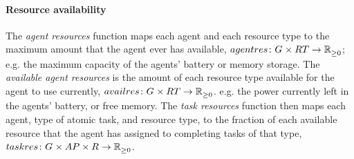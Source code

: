 \paragraph{Resource availability}
\newcommand{\functionAgentResourcesSymbol}[2]{
	\functionSymbol{agentres}
}
\newcommand{\formalAgentResources}[2]{
	\functionFormal{\functionAgentResourcesSymbol{}{}}
	{\setAgents{}{} \times \setResourceType{}{}}
	{\setRealNumbersNonNegative{}{}}
}
\newcommand{\functionAgentResources}[2]{
	\functionSignature{\functionAgentResourcesSymbol{}{}}{\varAgent{}{}, \varResourceType{}{}}
}
\newcommand{\functionAgentResourcesEnergy}[2]{
	\functionSignature{\functionAgentResourcesSymbol{}{}}{\varAgent{}{}, \varResourceType{e}{}}
}
\newcommand{\functionAgentAvailableResourcesSymbol}[2]{
	\functionSymbol{availres}{#1}{#2}
}
\newcommand{\formalAgentAvailableResources}[2]{
	\functionFormal{\functionAgentAvailableResourcesSymbol{}{}}
	{\setAgents{}{} \times \setResourceType{}{}}
	{\setRealNumbersNonNegative{}{}}
}
\newcommand{\functionAgentAvailableResources}[2]{
	\functionSignature{\functionAgentAvailableResourcesSymbol{}{}}
	{\varAgent{}{}, \varResourceType{}{}}
}
\newcommand{\functionAgentAvailableResourcesEnergy}[2]{
	\functionSignature{\functionAgentAvailableResourcesSymbol{}{}}
	{\varAgent{}{}, \varResourceType{e}{}}
}
\newcommand{\functionTaskResourceAllocationSymbol}[2]{
	\functionSymbol{taskres}{#1}{#2}
}
\newcommand{\formalTaskResourceAllocation}[2]{
	\functionFormal{\functionTaskResourceAllocationSymbol{}{}}
	{\setAgents{}{} \times \setAtomicTaskType{}{} \times \setResource{}{} }
	{\setRealNumbersNonNegative{}{}}
}
\newcommand{\functionTaskResourceAllocation}[2]{
	\functionSignature{\functionTaskResourceAllocationSymbol{}{}}
	{\varAgent{}{}, \varAtomicTaskType{}{}, \varResourceType{}{}}
}
\newcommand{\functionTaskResourceAllocationInstance}[2]{
	\functionSignature{\functionTaskResourceAllocationSymbol{}{}}
	{\varAgent{}{}, \functionAtomicTaskMapping{\varAtomicTask{}{}}{}, \varResourceType{}{}}
}

The \textit{agent resources} function maps each agent and each resource type to the maximum amount that the agent ever has available, $\formalAgentResources{}{}$; e.g. the maximum capacity of the agents' battery or memory storage. 
The \textit{available agent resources} is the amount of each resource type available for the agent to use currently, $\formalAgentAvailableResources{}{}$. e.g. the power currently left in the agents' battery, or free memory. The \textit{task resources} function then maps each agent, type of atomic task, and resource type, to the fraction of each available resource that the agent has assigned to completing tasks of that type, $\formalTaskResourceAllocation{}{}$.

